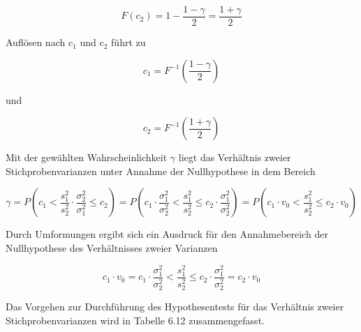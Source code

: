 \begin{equation}\label{eq:sixonehundredfourtynine}
F(c_{2})=1-\dfrac{1-\gamma}{2} =\dfrac{1+\gamma}{2}
\end{equation}

\noindent Aufl\"{o}sen nach c$_{1}$ und c$_{2}$ f\"{u}hrt zu

\begin{equation}\label{eq:sixonehundredfifty}
c_{1} =F^{-1} \left(\dfrac{1-\gamma}{2} \right)
\end{equation}

\noindent und

\begin{equation}\label{eq:sixonehundredfiftyone}
c_{2} =F^{-1} \left(\dfrac{1+\gamma }{2} \right)
\end{equation}

\noindent Mit der gew\"{a}hlten Wahrscheinlichkeit $\gamma$ liegt das Verh\"{a}ltnis zweier Stichprobenvarianzen unter Annahme der Nullhypothese in dem Bereich

\begin{equation}\label{eq:eq:sixonehundredfiftytwo}
\gamma =P\left(c_{1} <\dfrac{s_{1}^{2} }{s_{2}^{2} } \cdot \dfrac{\sigma _{2}^{2} }{\sigma _{1}^{2} } \le c_{2} \right)=P\left(c_{1} \cdot \dfrac{\sigma _{1}^{2} }{\sigma _{2}^{2} } <\dfrac{s_{1}^{2} }{s_{2}^{2} } \le c_{2} \cdot \dfrac{\sigma _{1}^{2} }{\sigma _{2}^{2} } \right)=P\left(c_{1} \cdot v_{0} <\dfrac{s_{1}^{2} }{s_{2}^{2} } \le c_{2} \cdot v_{0} \right)
\end{equation}

\noindent Durch Umformungen ergibt sich ein Ausdruck f\"{u}r den Annahmebereich der Nullhypothese des Verh\"{a}ltnisses zweier Varianzen

\begin{equation}\label{eq:sixonehundredfiftythree}
c_{1} \cdot v_{0} =c_{1} \cdot \dfrac{\sigma _{1}^{2} }{\sigma _{2}^{2} } <\dfrac{s_{1}^{2} }{s_{2}^{2} } \le c_{2} \cdot \dfrac{\sigma _{1}^{2} }{\sigma _{2}^{2} } =c_{2} \cdot v_{0}
\end{equation}

\noindent Das Vorgehen zur Durchf\"{u}hrung des Hypothesentests f\"{u}r das Verh\"{a}ltnis zweier Stichprobenvarianzen wird in Tabelle 6.12 zusammengefasst.

\clearpage

